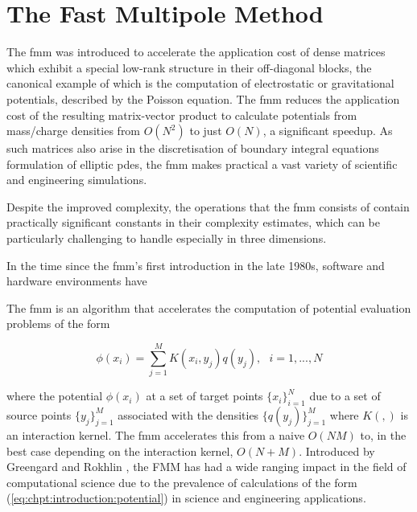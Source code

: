 
\chapter{The Fast Multipole Method}\label{chpt:fmm}
\thispagestyle{chaptertitle} %


The \acrshort{fmm} was introduced to accelerate the application cost of dense matrices which exhibit a special low-rank structure in their off-diagonal blocks, the canonical example of which is the computation of electrostatic or gravitational potentials, described by the Poisson equation. The \acrshort{fmm} reduces the application cost of the resulting matrix-vector product to calculate potentials from mass/charge densities from $O(N^2)$ to just $O(N)$, a significant speedup. As such matrices also arise in the discretisation of boundary integral equations formulation of elliptic \acrfull{pdes}, the \acrshort{fmm} makes practical a vast variety of scientific and engineering simulations.


Despite the improved complexity, the operations that the \acrshort{fmm} consists of contain practically significant constants in their complexity estimates, which can be particularly challenging to handle especially in three dimensions.


In the time since the \acrshort{fmm}'s first introduction in the late 1980s, software and hardware environments have




The \acrfull{fmm} is an algorithm that accelerates the computation of potential evaluation problems of the form

\begin{equation}
    \label{eq:chpt:introduction:potential}
    \phi(x_i) = \sum_{j=1}^M K(x_i, y_j) q(y_j), \> \> \> i=1,...,N
\end{equation}

where the potential $\phi(x_i)$ at a set of target points $\{ x_i \}_{i=1}^N$ due to a set of source points $\{ y_j \}_{j=1}^M$  associated with the densities $\{ q(y_j) \}_{j=1}^M$ where $K(,)$ is an interaction kernel. The \acrshort{fmm} accelerates this from a naive $O(NM)$ to, in the best case depending on the interaction kernel, $O(N + M)$. Introduced by Greengard and Rokhlin \cite{greengard1987fast}, the FMM has had a wide ranging impact in the field of computational science due to the prevalence of calculations of the form (\ref{eq:chpt:introduction:potential}) in science and engineering applications.

